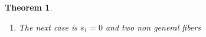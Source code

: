 \documentclass[12pt]{amsbook}
\theoremstyle{plain}
\newtheorem{thm}{Theorem}[section]
\begin{document}
\begin{thm}
\begin{enumerate}
\[\begin{tikzpicture}[baseline= (a).base]
\node[scale=.6] (a) at (0,0){
\begin{tikzcd}
        &               &                  &                                     &                                   &                                           & Y' \arrow[r] \arrow[rd]       & {Y_1^2}' \arrow[r] & \cdots \arrow[r] & {Y_{n_2'}^2}' \\
X = X_0 & X_1 \arrow[l] & \cdots \arrow[l] & X_{a-k_1-k_2-1} \arrow[l] \arrow[d] & X_{a-k_1-k_2} \arrow[l] \arrow[r] & X'_{a'-k_1'-k_2'-1} \arrow[rd] \arrow[ru] &                               & {Y_1^1}'           & \cdots \arrow[r] & {Y_{n_1'}^1}' \\
        &               &                  & Y \arrow[ld] \arrow[rd]             &                                   &                                           & X_{a'-k_1'-k_2'-2}' \arrow[r] & \cdots \arrow[r]   & X'_0             &               \\
        &               & Y_1^1 \arrow[d]  &                                     & Y_1^2 \arrow[d]                   &                                           &                               &                    &                  &               \\
        &               & \vdots \arrow[d] &                                     & \vdots \arrow[d]                  &                                           &                               &                    &                  &               \\
        &               & Y_{n_1}^1        &                                     & Y_{n_2}^2                         &                                           &                               &                    &                  &              
\end{tikzcd}
};
\end{tikzpicture}
\]
\item The next case is $s_1 = 0$ and two non general fibers
\[
\]
\end{enumerate}
\end{thm}
\end{document}
